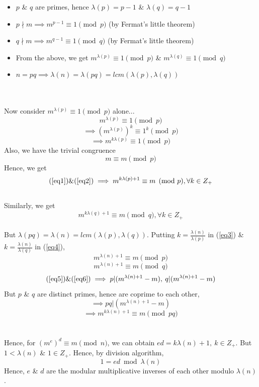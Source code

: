 \begin{itemize}
	\item $p$ \& $q$ are primes, hence $\lambda(p)=p-1$ \& $\lambda(q)=q-1$
	\item $p \nmid m \implies m^{p-1} \equiv 1 \pmod p$ (by Fermat's little theorem)
	\item $q \nmid m \implies m^{q-1}  \equiv 1 \pmod q$ (by Fermat's little theorem)
	\item From the above, we get $m^{\lambda(p)} \equiv 1 \pmod p$ \& $m^{\lambda(q)} \equiv 1 \pmod q$
	\item $n=pq \implies \lambda(n) = \lambda(pq) = lcm(\lambda(p), \lambda(q))$
\end{itemize}
\\~\\
Now consider $m^{\lambda(p)} \equiv 1 \pmod p$ alone...
\[m^{\lambda(p)} \equiv 1 \pmod p\]
\[\implies (m^{\lambda(p)})^k \equiv 1^k \pmod p\]
\begin{equation} \label{eq1} \implies m^{k\lambda(p)} \equiv 1 \pmod p\end{equation}
Also, we have the trivial congruence
\begin{equation} \label{eq2} m \equiv m \pmod p\end{equation}
Hence, we get
\begin{equation} \label{eq3} (\ref{eq1}) \& (\ref{eq2}) \implies m^{k\lambda(p)+1} \equiv m \pmod p, \forall k \in Z_+\end{equation}
\\Similarly, we get
\begin{equation} \label{eq4} m^{k\lambda(q)+1} \equiv m \pmod q, \forall k \in Z_+ \end{equation}
\\But $\lambda(pq) = \lambda(n) = lcm(\lambda(p), \lambda(q))$. Putting $k=\frac{\lambda(n)}{\lambda(p)}$ in (\ref{eq3}) \& $k=\frac{\lambda(n)}{\lambda(q)}$ in (\ref{eq4}),
\begin{equation} \label{eq5} m^{\lambda(n)+1} \equiv m \pmod p\end{equation}
\begin{equation} \label{eq6} m^{\lambda(n)+1} \equiv m \pmod q\end{equation}
\begin{equation} (\ref{eq5}) \&  (\ref{eq6}) \implies p | (m^{\lambda(n)+1} - m), \: q | (m^{\lambda(n)+1} - m) \end{equation}
But $p$ \& $q$ are distinct primes, hence are coprime to each other,
\[\implies pq | (m^{\lambda(n)+1} - m)\]
\[\implies m^{k\lambda(n)+1} \equiv m \pmod {pq}\]
\\~\\
Hence, for $(m^e)^d \equiv m \pmod n$, we can obtain $ed = k\lambda(n)+1, \: k \in Z_+$. But $1<\lambda(n)$ \& $1 \in Z_+$. Hence, by division algorithm,
\begin{equation} \label{eq7} 1 = ed \bmod \lambda(n) \end{equation}
Hence, $e$ \& $d$ are the modular multiplicative inverses of each other modulo $\lambda(n)$.

